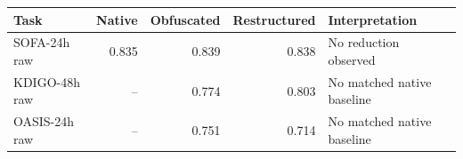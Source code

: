 \begin{tabular}{lrrrl}
\toprule
Task & Native & Obfuscated & Restructured & Interpretation \\
\midrule
SOFA-24h raw & 0.835 & 0.839 & 0.838 & No reduction observed \\
KDIGO-48h raw & -- & 0.774 & 0.803 & No matched native baseline \\
OASIS-24h raw & -- & 0.751 & 0.714 & No matched native baseline \\
\bottomrule
\end{tabular}
